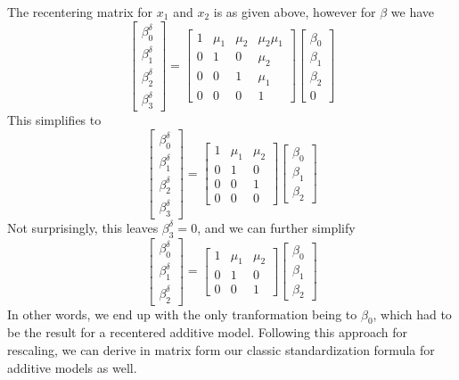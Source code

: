 \documentclass[]{article}
\begin{document}
The recentering matrix for \(x_1\) and \(x_2\) is as given above,
however for \(\beta\) we have
\[\begin{bmatrix}\beta_0^\delta \\ \beta_1^\delta \\ \beta_2^\delta \\ \beta_3^\delta \end{bmatrix}=
\begin{bmatrix} 1 & \mu_1 &\mu_2 &\mu_2\mu_1 \\
  0 &1 &0 &\mu_2 \\ 0 &0 &1 &\mu_1 \\ 0 &0 &0 &1 \end{bmatrix}
\begin{bmatrix}\beta_0 \\ \beta_1 \\ \beta_2 \\ 0 \end{bmatrix}\] This
simplifies to
\[\begin{bmatrix}\beta_0^\delta \\ \beta_1^\delta \\ \beta_2^\delta  \\ \beta_3^\delta \end{bmatrix}=
\begin{bmatrix} 1 & \mu_1 &\mu_2 \\
  0 &1 &0 \\ 0 &0 &1 \\ 0 &0 &0 \end{bmatrix}
\begin{bmatrix}\beta_0 \\ \beta_1 \\ \beta_2 \end{bmatrix}\] Not
surprisingly, this leaves \(\beta_3^\delta=0\), and we can further
simplify
\[\begin{bmatrix}\beta_0^\delta \\ \beta_1^\delta \\ \beta_2^\delta \end{bmatrix}=
\begin{bmatrix} 1 & \mu_1 &\mu_2 \\
  0 &1 &0 \\ 0 &0 &1 \end{bmatrix}
\begin{bmatrix}\beta_0 \\ \beta_1 \\ \beta_2 \end{bmatrix}\] In other
words, we end up with the only tranformation being to \(\beta_0\), which
had to be the result for a recentered additive model. Following this
approach for rescaling, we can derive in matrix form our classic
standardization formula for additive models as well.
\end{document}
